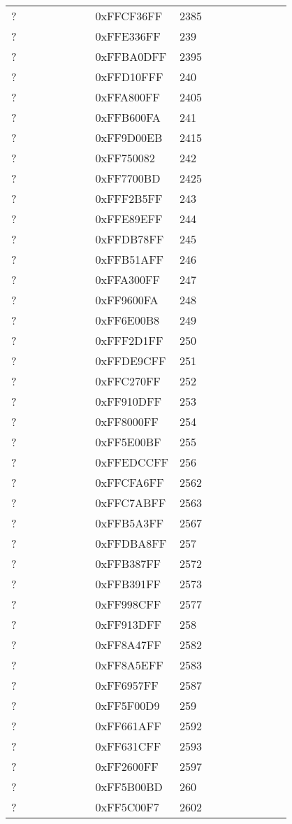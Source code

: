 \begin{longtable}{p{0.3\linewidth} p{0.3\linewidth} p{0.4\linewidth}}
? &  0xFFCF36FF &  2385\\
? &  0xFFE336FF &  239\\
? &  0xFFBA0DFF &  2395\\
? &  0xFFD10FFF &  240\\
? &  0xFFA800FF &  2405\\
? &  0xFFB600FA &  241\\
? &  0xFF9D00EB &  2415\\
? &  0xFF750082 &  242\\
? &  0xFF7700BD &  2425\\
? &  0xFFF2B5FF &  243\\
? &  0xFFE89EFF &  244\\
? &  0xFFDB78FF &  245\\
? &  0xFFB51AFF &  246\\
? &  0xFFA300FF &  247\\
? &  0xFF9600FA &  248\\
? &  0xFF6E00B8 &  249\\
? &  0xFFF2D1FF &  250\\
? &  0xFFDE9CFF &  251\\
? &  0xFFC270FF &  252\\
? &  0xFF910DFF &  253\\
? &  0xFF8000FF &  254\\
? &  0xFF5E00BF &  255\\
? &  0xFFEDCCFF &  256\\
? &  0xFFCFA6FF &  2562\\
? &  0xFFC7ABFF &  2563\\
? &  0xFFB5A3FF &  2567\\
? &  0xFFDBA8FF &  257\\
? &  0xFFB387FF &  2572\\
? &  0xFFB391FF &  2573\\
? &  0xFF998CFF &  2577\\
? &  0xFF913DFF &  258\\
? &  0xFF8A47FF &  2582\\
? &  0xFF8A5EFF &  2583\\
? &  0xFF6957FF &  2587\\
? &  0xFF5F00D9 &  259\\
? &  0xFF661AFF &  2592\\
? &  0xFF631CFF &  2593\\
? &  0xFF2600FF &  2597\\
? &  0xFF5B00BD &  260\\
? &  0xFF5C00F7 &  2602\\

\end{longtable}
